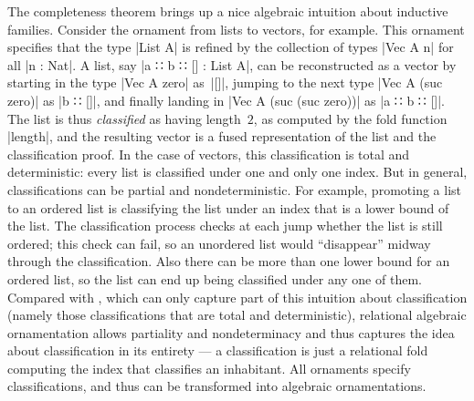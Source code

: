 The completeness theorem brings up a nice algebraic intuition about inductive families.
Consider the ornament from lists to vectors, for example.
This ornament specifies that the type |List A| is refined by the collection of types |Vec A n| for all |n : Nat|.
A list, say |a ∷ b ∷ [] : List A|, can be reconstructed as a vector by starting in the type |Vec A zero| as~|[]|, jumping to the next type |Vec A (suc zero)| as |b ∷ []|, and finally landing in |Vec A (suc (suc zero))| as |a ∷ b ∷ []|.
The list is thus \emph{classified} as having length~$2$, as computed by the fold function |length|, and the resulting vector is a fused representation of the list and the classification proof.
In the case of vectors, this classification is total and deterministic: every list is classified under one and only one index.
But in general, classifications can be partial and nondeterministic.
For example, promoting a list to an ordered list is classifying the list under an index that is a lower bound of the list.
The classification process checks at each jump whether the list is still ordered; this check can fail, so an unordered list would ``disappear'' midway through the classification.
Also there can be more than one lower bound for an ordered list, so the list can end up being classified under any one of them.
Compared with , which can only capture part of this intuition about classification (namely those classifications that are total and deterministic), relational algebraic ornamentation allows partiality and nondeterminacy and thus captures the idea about classification in its entirety --- a classification is just a relational fold computing the index that classifies an inhabitant.
All ornaments specify classifications, and thus can be transformed into algebraic ornamentations.

